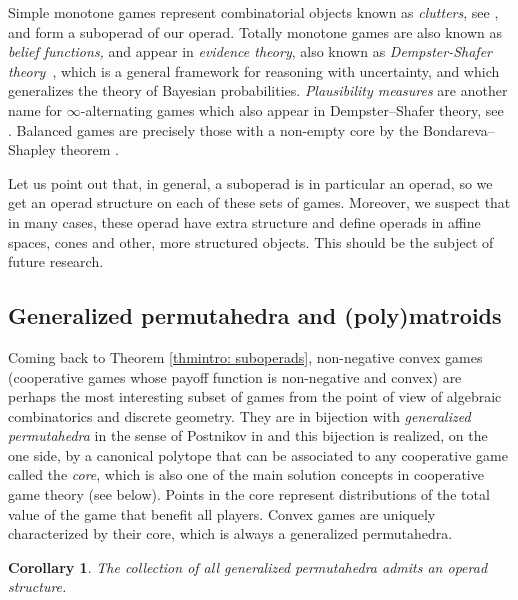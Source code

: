 \documentclass[a4paper,12pt]{amsart}
\newtheorem*{corollaryintro}{Corollary}
\begin{document}
\medskip

Simple monotone games represent combinatorial objects known as \textit{clutters}, see \cite{billera1971composition}, and form a suboperad of our operad. Totally monotone games are also known as \textit{belief functions,} and appear in \emph{evidence theory}, also known as \emph{Dempster-Shafer theory}~\cite{dempster1967upper, shafer1976mathematical, kohlas2013mathematical}, which is a general framework for reasoning with uncertainty, and which generalizes the theory of Bayesian probabilities. \textit{Plausibility measures} are another name for $\infty$-alternating games which also appear in Dempster--Shafer theory, see \cite{shafer1976mathematical, Hohle87}. Balanced games are precisely those with a non-empty core by the Bondareva--Shapley theorem \cite{Bondareva, ShapleyCore}. 

\medskip

Let us point out that, in general, a suboperad is in particular an operad, so we get an operad structure on each of these sets of games. Moreover, we suspect that in many cases, these operad have extra structure and define operads in affine spaces, cones and other, more structured objects. This should be the subject of future research. 

\medskip

\subsection*{Generalized permutahedra and (poly)matroids} Coming back to Theorem \ref{thmintro: suboperads}, non-negative convex games (cooperative games whose payoff function is non-negative and convex) are perhaps the most interesting subset of games from the point of view of algebraic combinatorics and discrete geometry. They are in bijection with \textit{generalized permutahedra} in the sense of Postnikov in \cite{Postnikov} and this bijection is realized, on the one side, by a canonical polytope that can be associated to any cooperative game called the \textit{core}, which is also one of the main solution concepts in cooperative game theory (see below). Points in the core represent distributions of the total value of the game that benefit all players. Convex games are uniquely characterized by their core, which is always a generalized permutahedra.  

\begin{corollaryintro}
The collection of all generalized permutahedra admits an operad structure.
\end{corollaryintro}
\end{document}
